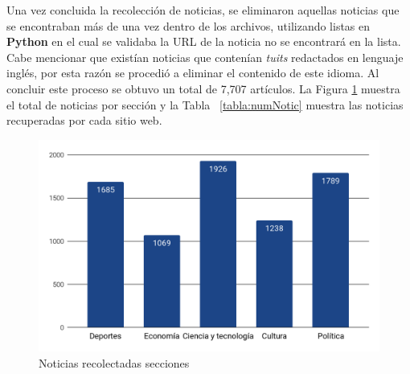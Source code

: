 Una vez concluida la recolección de noticias, se eliminaron aquellas noticias que se encontraban más de una vez dentro de los archivos, utilizando listas en \textbf{Python} en el cual se validaba la URL de la noticia no se encontrará en la lista. Cabe mencionar que existían noticias que contenían \textit{tuits} redactados en lenguaje inglés, por esta razón se procedió a eliminar el contenido de este idioma. Al concluir este proceso se obtuvo un total de 7,707 artículos. La Figura  \ref{fig:cp5:secciones} muestra el total de noticias por sección y la Tabla \ \ref{tabla:numNotic} muestra las noticias recuperadas por cada sitio web.




\begin{figure}[h]
  \centering
  \includegraphics[scale=.32]{imagenes/Capitulo5/seccionesCr.png}
  \caption{Noticias recolectadas secciones}
  \label{fig:cp5:secciones}
\end{figure}


%
%

